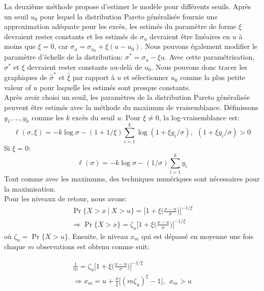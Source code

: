 \documentclass[11pt]{report}
\numberwithin{equation}{section}
\begin{document}
La deuxième méthode propose d'estimer le modèle pour différents seuils. Après un seuil $u_0$ pour lequel la distribution Pareto généralisée fournie une approximation adéquate pour les excès, les estimés du paramètre de forme $\xi$ devraient rester constants et les estimés de $\sigma_u$ devraient être linéaires en $u$ à moins que $\xi =0$, car $\sigma_u = \sigma_{u_0} + \xi(u - u_0)$. Nous pouvons également modifier le paramètre d'échelle de la distribution: $\sigma^* = \sigma_u - \xi u$. Avec cette paramétrisation, $\sigma^*$ et $\xi$ devraient rester constants au-delà de $u_0$. Nous pouvons donc tracer les graphiques de $\hat\sigma^*$ et $\hat\xi$ par rapport à $u$ et sélectionner $u_0$ comme la plus petite valeur of $u$ pour laquelle les estimés sont presque constants.\\ 

Après avoir choisi un seuil, les paramètres de la distribution Pareto généralisée peuvent être estimés avec la méthode du maximum de vraisemblance. Définissons $y_1,\dots,y_k$ comme les $k$ excès du seuil $u$. Pour $\xi \ne 0$, la log-vraisemblance est:
\begin{equation}\label{eq:1.2.6}
{\ell(\sigma, \xi) = -k\log\sigma - (1+1/\xi)\sum_{i=1}^{k}\log(1+\xi{y_i}/\sigma),\ \ (1+\xi{y_i}/\sigma) >0}
\end{equation}
Si $\xi =0$:
\begin{equation}\label{eq:1.2.7}
{\ell(\sigma) = -k\log\sigma - (1/\sigma)\sum_{i=1}^{k}y_i}
\end{equation}
Tout comme avec les maximums, des techniques numériques sont nécessaires pour la maximisation.\\

Pour les niveaux de retour, nous avons:
\begin{equation}\label{eq:1.2.8}
\begin{split}
{\Pr\{ X>x\ |\ X>u\} = \Big[ 1 + \xi \Big( \frac{x-u}{\sigma}\Big)\Big]^{-1/\xi}}\\
{\Rightarrow \Pr\{X>x\} = \zeta_u \Big[1 + \xi \Big( \frac{x-u}{\sigma}\Big)\Big]^{-1/\xi}}
\end{split}
\end{equation}
où $\zeta_u = \Pr\{X>u\}$. Ensuite, le niveau $x_m$ qui est dépassé en moyenne une fois chaque $m$ observations est obtenu comme suit:

\begin{equation}\label{eq:1.2.9}
\begin{split}
{\frac{1}{m} = \zeta_u \Big[1 + \xi \Big( \frac{x-u}{\sigma}\Big)\Big]^{-1/\xi}}\\
{\Rightarrow x_m = u + \frac{\sigma}{\xi} \Big[(m\zeta_u)^\xi -1\Big],\ \ x_m>u}
\end{split}
\end{equation}
\end{document}
